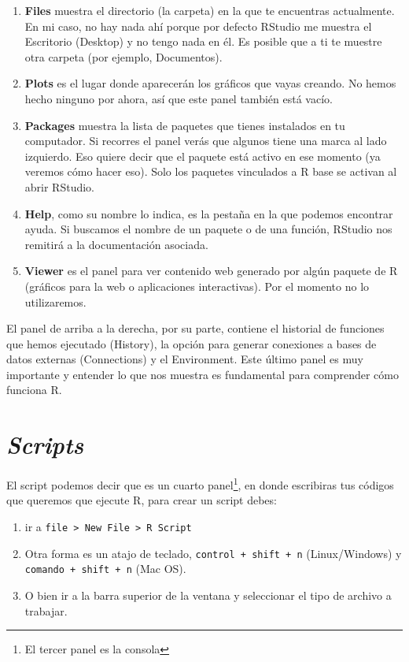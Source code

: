\documentclass[12pt,]{book}
\providecommand{\tightlist}{%
  \setlength{\itemsep}{0pt}\setlength{\parskip}{0pt}}
\begin{document}
\begin{enumerate}
\def\labelenumi{\arabic{enumi}.}
\item
  \textbf{Files} muestra el directorio (la carpeta) en la que te
  encuentras actualmente. En mi caso, no hay nada ahí porque por defecto
  RStudio me muestra el Escritorio (Desktop) y no tengo nada en él. Es
  posible que a ti te muestre otra carpeta (por ejemplo, Documentos).
\item
  \textbf{Plots} es el lugar donde aparecerán los gráficos que vayas
  creando. No hemos hecho ninguno por ahora, así que este panel también
  está vacío.
\item
  \textbf{Packages} muestra la lista de paquetes que tienes instalados
  en tu computador. Si recorres el panel verás que algunos tiene una
  marca al lado izquierdo. Eso quiere decir que el paquete está activo
  en ese momento (ya veremos cómo hacer eso). Solo los paquetes
  vinculados a R base se activan al abrir RStudio.
\item
  \textbf{Help}, como su nombre lo indica, es la pestaña en la que
  podemos encontrar ayuda. Si buscamos el nombre de un paquete o de una
  función, RStudio nos remitirá a la documentación asociada.
\item
  \textbf{Viewer} es el panel para ver contenido web generado por algún
  paquete de R (gráficos para la web o aplicaciones interactivas). Por
  el momento no lo utilizaremos.
\end{enumerate}

El panel de arriba a la derecha, por su parte, contiene el historial de
funciones que hemos ejecutado (History), la opción para generar
conexiones a bases de datos externas (Connections) y el Environment.
Este último panel es muy importante y entender lo que nos muestra es
fundamental para comprender cómo funciona R.

\section{\texorpdfstring{\emph{Scripts}}{Scripts}}\label{scripts}

El script podemos decir que es un cuarto panel\footnote{El tercer panel
  es la consola}, en donde escribiras tus códigos que queremos que
ejecute R, para crear un script debes:

\begin{enumerate}
\def\labelenumi{\arabic{enumi}.}
\tightlist
\item
  ir a
  \texttt{file\ \textgreater{}\ New\ File\ \textgreater{}\ R\ Script}
\item
  Otra forma es un atajo de teclado, \texttt{control\ +\ shift\ +\ n}
  (Linux/Windows) y \texttt{comando\ +\ shift\ +\ n} (Mac OS).
\item
  O bien ir a la barra superior de la ventana y seleccionar el tipo de
  archivo a trabajar.
\end{enumerate}
\end{document}
